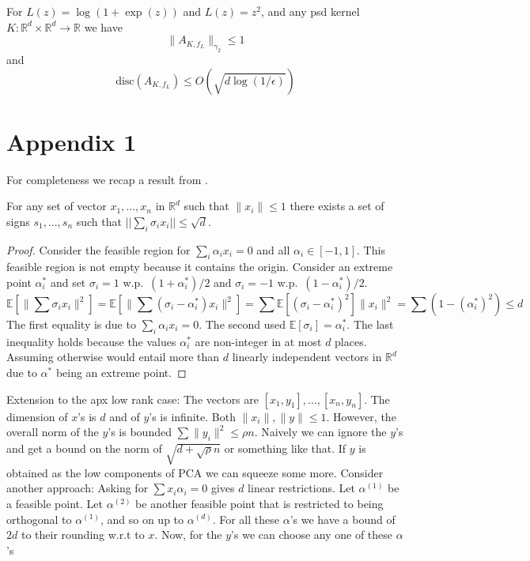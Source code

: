 \documentclass[anon,12pt]{colt2019} %
\newcommand{\R}{\mathbb{R}}
\newcommand{\E}{\mathbb{E}}
\newcommand{\eps}{\epsilon}
\newcommand{\disc}{\text{disc}}
\begin{document}
\begin{corollary}
For $L(z)=\log(1+\exp(z))$ and $L(z) = z^2$, and any psd kernel $K:\R^d \times \R^d \to \R$ we have
$$\|A_{K,f_L}\|_{\gamma_2} \leq 1 $$ 
and
$$\disc(A_{K,f_L}) \leq O(\sqrt{d\log(1/\eps)}) $$ 
\end{corollary}





\section{Appendix 1}
For completeness we recap a result from \cite{barany2008}.
\begin{theorem}
For any set of vector $x_1,...,x_n$ in $\R^d$ such that $\|x_i\| \le 1$ there exists a set of signs $s_1,...,s_n$ such that $||\sum_i \sigma_i x_i || \le \sqrt{d}$.
\end{theorem}
\begin{proof}
Consider the feasible region for $\sum_i \alpha_i x_i = 0$ and all $\alpha_i \in [-1,1]$.
This feasible region is not empty because it contains the origin. 
Consider an extreme point $\alpha^*_i$ and set $\sigma_i = 1$ w.p.\ $(1+\alpha^*_i)/2$ and $\sigma_i = -1$ w.p.\ $(1-\alpha^*_i)/2$.
$$
\E[\|\sum \sigma_i x_i\|^2] =  \E[\|\sum (\sigma_i - \alpha^*_i) x_i\|^2] = \sum \E[(\sigma_i - \alpha^*_i)^2] \|x_i\|^2= \sum (1-(\alpha_i^*)^2) \le d
$$
The first equality is due to $\sum_i \alpha_i x_i = 0$. The second used $\E[\sigma_i] = \alpha^*_i $.
The last inequality holds because the values $\alpha^*_i$ are non-integer in at most $d$ places. 
Assuming otherwise would entail more than $d$ linearly independent vectors in $\R^d$ due to $\alpha^*$ being an extreme point.
\end{proof}

Extension to the apx low rank case: The vectors are $[x_1,y_1],\ldots,[x_n,y_n]$. The dimension of $x$'s is $d$ and of $y$'s is infinite. Both $\|x_i\|, \|y\| \leq 1$. However, the overall norm of the $y$'s is bounded $\sum \|y_i\|^2 \leq \rho n$. Naively we can ignore the $y$'s and get a bound on the norm of $\sqrt{d + \sqrt{\rho} n}$ or something like that. If $y$ is obtained as the low components of PCA we can squeeze some more.
Consider another approach: Asking for $\sum x_i \alpha_i =0 $ gives $d$ linear restrictions. Let $\alpha^{(1)}$ be a feasible point. Let $\alpha^{(2)}$ be another feasible point that is restricted to being orthogonal to $\alpha^{(1)}$, and so on up to $\alpha^{(d)}$. For all these $\alpha$'s we have a bound of $2d$ to their rounding w.r.t to $x$. Now, for the $y$'s we can choose any one of these $\alpha$'s
\end{document}
